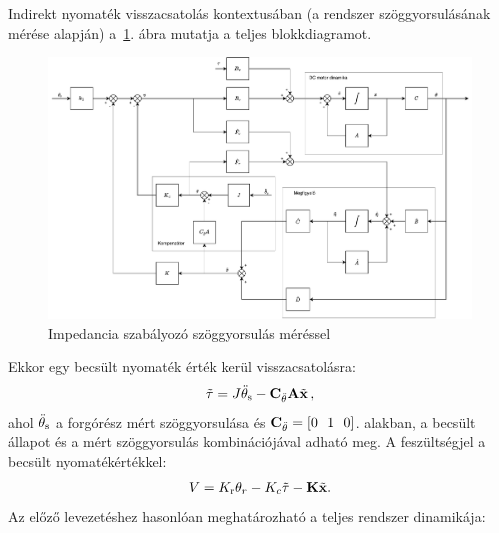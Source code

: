 Indirekt nyomaték visszacsatolás kontextusában (a rendszer szöggyorsulásának mérése alapján) 
a~\ref{fig:block_diagram_indirect_compensation}. ábra mutatja a teljes blokkdiagramot.
\begin{figure}[ht]
    \begin{center}
    \includegraphics[width=\textwidth]{images/compensated_position_controller_angular_acceleration.pdf}
    \caption{Impedancia szabályozó szöggyorsulás méréssel}\label{fig:block_diagram_indirect_compensation}
    \end{center}
\end{figure}
Ekkor egy becsült nyomaték érték kerül visszacsatolásra:
\begin{align}
    \tilde \tau = J \ddot \theta_{\mathrm{s}} - \mathbf{C}_{\ddot\theta} \mathbf{A} \tilde{\mathbf{x}}\,,
\end{align}
ahol \(\ddot \theta_{\mathrm{s}}\) a forgórész mért szöggyorsulása és \(\mathbf{C}_{\ddot\theta} = [0~~1~~0]\).
alakban, a becsült állapot és a mért szöggyorsulás kombinációjával adható meg.
A feszültségjel a becsült nyomatékértékkel:
\begin{align}
    V = K_{\mathrm{r}} \theta_r - K_c \tilde \tau - \mathbf{K} \tilde{\mathbf{x}}.
\end{align}
Az előző levezetéshez hasonlóan meghatározható a teljes rendszer dinamikája:
